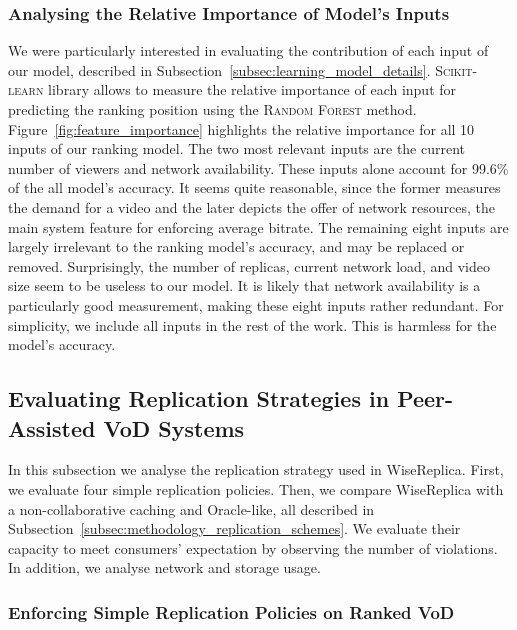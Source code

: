 \subsubsection{Analysing the Relative Importance of Model's Inputs}

We were particularly interested in evaluating the contribution of each input of our model, described in Subsection~\ref{subsec:learning_model_details}. \textsc{Scikit-learn} library allows to measure the relative importance of each input for predicting the ranking position using the \textsc{Random Forest} method. Figure~\ref{fig:feature_importance} highlights the relative importance for all 10 inputs of our ranking model. The two most relevant inputs are the current number of viewers and network availability. These inputs alone account for 99.6\% of the all model's accuracy. It seems quite reasonable, since the former measures the demand for a video and the later depicts the offer of network resources, the main system feature for enforcing average bitrate. The remaining eight inputs are largely irrelevant to the ranking model's accuracy, and may be replaced or removed. Surprisingly, the number of replicas, current network load, and video size seem to be useless to our model. It is likely that network availability is a particularly good measurement, making these eight inputs rather redundant. For simplicity, we include all inputs in the rest of the work. This is harmless for the model's accuracy.

\subsection{Evaluating Replication Strategies in Peer-Assisted VoD Systems}
\label{subsec:performance_evaluation}

In this subsection we analyse the replication strategy used in WiseReplica. First, we evaluate four simple replication policies. Then, we compare WiseReplica with a non-collaborative caching and Oracle-like, all described in Subsection~\ref{subsec:methodology_replication_schemes}. We evaluate their capacity to meet consumers' expectation by observing the number of violations. In addition, we analyse network and storage usage.

\subsubsection{Enforcing Simple Replication Policies on Ranked VoD}


